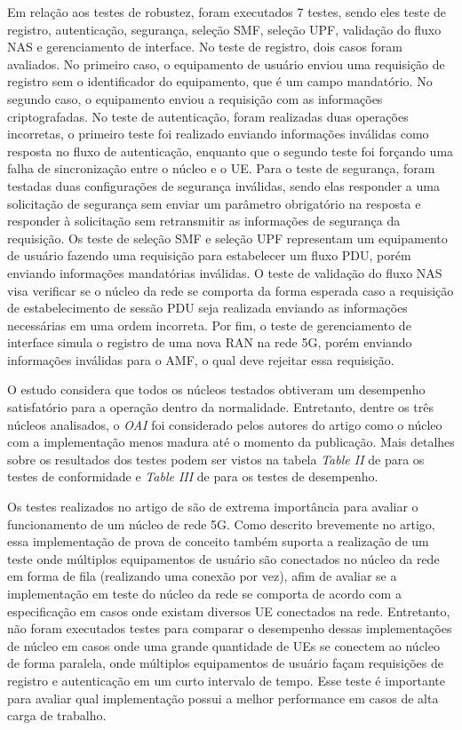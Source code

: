 Em relação aos testes de robustez, foram executados 7 testes, sendo eles teste de registro, autenticação, segurança, seleção SMF, seleção UPF, validação do fluxo NAS e gerenciamento de interface.
No teste de registro, dois casos foram avaliados. No primeiro caso, o equipamento de usuário enviou uma requisição de registro sem o identificador do equipamento, que é um campo mandatório. No segundo caso, o equipamento enviou a requisição com as informações criptografadas.
No teste de autenticação, foram realizadas duas operações incorretas, o primeiro teste foi realizado enviando informações inválidas como resposta no fluxo de autenticação, enquanto que o segundo teste foi forçando uma falha de sincronização entre o núcleo e o UE.
Para o teste de segurança, foram testadas duas configurações de segurança inválidas, sendo elas responder a uma solicitação de segurança sem enviar um parâmetro obrigatório na resposta e responder à solicitação sem retransmitir as informações de segurança da requisição.
Os teste de seleção SMF e seleção UPF representam um equipamento de usuário fazendo uma requisição para estabelecer um fluxo PDU, porém enviando informações mandatórias inválidas.
O teste de validação do fluxo NAS visa verificar se o núcleo da rede se comporta da forma esperada caso a requisição de estabelecimento de sessão PDU seja realizada enviando as informações necessárias em uma ordem incorreta.
Por fim, o teste de gerenciamento de interface simula o registro de uma nova RAN na rede 5G, porém enviando informações inválidas para o AMF, o qual deve rejeitar essa requisição. 

O estudo considera que todos os núcleos testados obtiveram um desempenho satisfatório para a operação dentro da normalidade. Entretanto, dentre os três núcleos analisados, o \textit{OAI} foi considerado pelos autores do artigo como o núcleo com a implementação menos madura até o momento da publicação.
Mais detalhes sobre os resultados dos testes podem ser vistos na tabela \textit{Table II} de \cite[p.~10]{Dominato2021} para os testes de conformidade e \textit{Table III} de \cite[p.~11]{Dominato2021} para os testes de desempenho.

Os testes realizados no artigo de \cite{Dominato2021} são de extrema importância para avaliar o funcionamento de um núcleo de rede 5G.
Como descrito brevemente no artigo, essa implementação de prova de conceito também suporta a realização de um teste onde múltiplos equipamentos de usuário são conectados no núcleo da rede em forma de fila (realizando uma conexão por vez), afim de avaliar se a implementação em teste do núcleo da rede se comporta de acordo com a especificação em casos onde existam diversos UE conectados na rede.
Entretanto, não foram executados testes para comparar o desempenho dessas implementações de núcleo em casos onde uma grande quantidade de UEs se conectem ao núcleo de forma paralela, onde múltiplos equipamentos de usuário façam requisições de registro e autenticação em um curto intervalo de tempo.
Esse teste é importante para avaliar qual implementação possui a melhor performance em casos de alta carga de trabalho.

